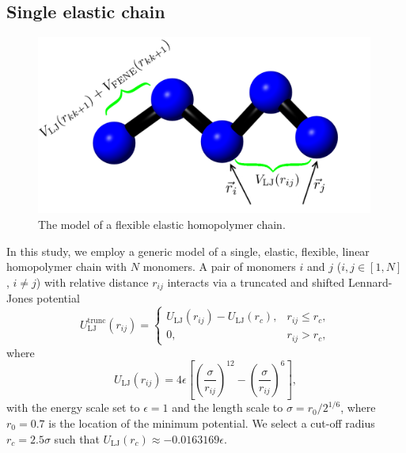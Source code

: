 \documentclass[12pt]{report}
\begin{document}
\subsection{Single elastic chain}
%
\begin{figure}
\center
\includegraphics[width = 0.99\textwidth]{chapter4Figs/singleChain.png}
\caption{\label{fig:singleChain}%
The model of a flexible elastic homopolymer chain.
}
\end{figure}
% 

In this study, we employ a generic model of a single, elastic, flexible,
linear
homopolymer chain with $N$ monomers. A pair of monomers $i$ and $j$
($i,j\in [1,N]$, $i\neq j$) with relative distance $r_{ij}$ interacts
via a
truncated and shifted Lennard-Jones potential
\begin{equation}
U_{\mathrm{LJ}}^{\mathrm{trunc}}(r_{ij}) =  \begin{cases}
U_{\mathrm{LJ}}(r_{ij}) -  U_{\mathrm{LJ}}(r_{c}), &
r_{ij} \leq r_{c},\\
0, &   r_{ij} > r_{c}, \end{cases}
\end{equation}
where
\begin{equation}
U_{\mathrm{LJ}}(r_{ij})= 4\epsilon \left[ \left(
\frac{\sigma}{r_{ij}} \right)^{12} - 			\left(
\frac{\sigma}{r_{ij}} \right)^{6} \right], 
\label{LJ2}
\end{equation}
with the energy scale set to $\epsilon=1$ and the length scale to 
$\sigma=r_0/2^{1/6}$, where $r_0 = 0.7$ is the location of the minimum
potential. We select a cut-off radius $r_c=2.5\sigma$ such that
$U_{\mathrm{LJ}}(r_{c}) \approx -0.0163169\epsilon$.
\end{document}
